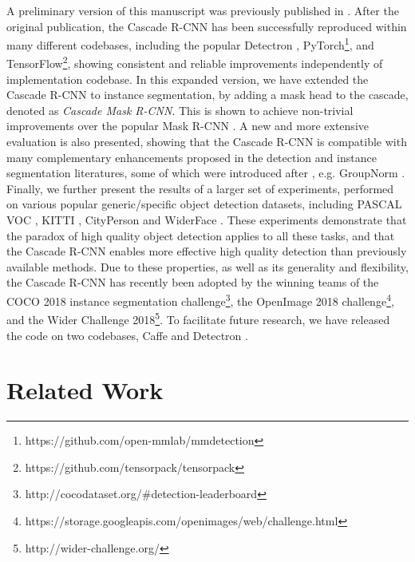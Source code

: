 \documentclass[10pt,journal,compsoc]{IEEEtran}
\begin{document}
A preliminary version of this manuscript was previously published
in \cite{cai18cascadercnn}. After the original publication, the
Cascade R-CNN has been successfully reproduced within many different
codebases, including the popular Detectron \cite{Detectron2018}, PyTorch\footnote{https://github.com/open-mmlab/mmdetection}, and TensorFlow\footnote{https://github.com/tensorpack/tensorpack}, showing consistent and reliable improvements independently of
implementation codebase.
In this expanded version, we have extended the Cascade R-CNN to instance
segmentation, by adding a mask head to the cascade, denoted as {\it Cascade Mask R-CNN}.
This is shown to
achieve non-trivial improvements over the popular Mask
R-CNN \cite{he2017mask}. A new and more extensive evaluation
is also presented, showing that the Cascade R-CNN is compatible with many
complementary enhancements proposed in the detection and instance segmentation
literatures, some of which were introduced after \cite{cai18cascadercnn}, e.g. GroupNorm \cite{DBLP:conf/eccv/WuH18}. Finally, we further present the results of a larger set of
experiments, performed on various popular generic/specific object detection
datasets, including PASCAL VOC \cite{DBLP:journals/ijcv/EveringhamGWWZ10},
KITTI \cite{DBLP:conf/cvpr/GeigerLU12},
CityPerson \cite{DBLP:conf/cvpr/ZhangBS17} and
WiderFace \cite{DBLP:conf/cvpr/YangLLT16}. These experiments demonstrate
that the paradox of high quality object detection applies to all
these tasks, and that the Cascade R-CNN enables more effective high quality detection
than previously available methods. Due to these properties, as well as its
generality and flexibility, the Cascade R-CNN has recently been adopted
by the winning teams of the COCO 2018 instance segmentation
challenge\footnote{http://cocodataset.org/\#detection-leaderboard},
the OpenImage 2018
challenge\footnote{https://storage.googleapis.com/openimages/web/challenge.html}, and the Wider Challenge 2018\footnote{http://wider-challenge.org/}.
To facilitate future research, we have released the code on two codebases,
Caffe \cite{DBLP:conf/mm/JiaSDKLGGD14} and Detectron \cite{Detectron2018}.


\section{Related Work}
\end{document}
